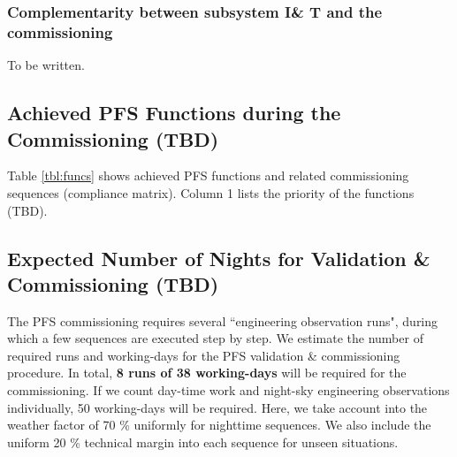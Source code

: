 
\subsubsection{Complementarity between subsystem I\& T and the commissioning}
To be written.







\subsection{Achieved PFS Functions during the Commissioning (TBD)}\label{sec:cmatrix}
Table \ref{tbl:funcs} shows achieved PFS functions and related commissioning sequences (compliance matrix).
Column 1 lists the priority of the functions (TBD).



\subsection{Expected Number of Nights for Validation \& Commissioning (TBD)}
The PFS commissioning requires several ``engineering observation runs", during which a few sequences are executed step by step.
We estimate the number of required runs and working-days for the PFS validation \& commissioning procedure.
In total, {\bf 8 runs of 38 working-days} will be  required for the commissioning. 
If we count day-time work and night-sky engineering observations individually, 50 working-days will be required.
Here, we take account into the weather factor of 70 \% uniformly  for nighttime sequences.
We also include the uniform 20 \% technical margin into each sequence for unseen situations.

